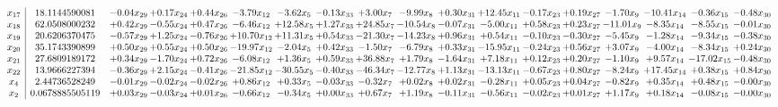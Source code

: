 \documentclass[9pt]{article}
\begin{document}
 \[\begin{array}{c| c c@{\hskip 2pt} c@{\hskip 2pt} c@{\hskip 2pt} c@{\hskip 2pt} c@{\hskip 2pt} c@{\hskip 2pt} c@{\hskip 2pt} c@{\hskip 2pt} c@{\hskip 2pt} c@{\hskip 2pt} c@{\hskip 2pt} c@{\hskip 2pt} c@{\hskip 2pt} c@{\hskip 2pt} c@{\hskip 2pt} c@{\hskip 2pt} }
 x_{17}   &  18.1144590081 & -0.04 x_{29} & +  0.17 x_{24} & +  0.44 x_{26} & -3.79 x_{12} & -3.62 x_{5} & -0.13 x_{33} & +  3.00 x_{7} & -9.99 x_{8} & +  0.30 x_{31} & + 12.45 x_{11} & -0.17 x_{23} & +  0.19 x_{27} & -1.70 x_{9} & -10.41 x_{14} & -0.36 x_{15} & -0.48 x_{30}\\
 x_{18}   &  62.0508000232 & +  0.42 x_{29} & -0.55 x_{24} & +  0.47 x_{26} & -6.46 x_{12} & + 12.58 x_{5} & +  1.27 x_{33} & + 24.85 x_{7} & -10.54 x_{8} & -0.07 x_{31} & -5.00 x_{11} & +  0.58 x_{23} & +  0.23 x_{27} & -11.01 x_{9} & -8.35 x_{14} & -8.55 x_{15} & -0.01 x_{30}\\
 x_{19}   &  20.6206370475 & -0.57 x_{29} & +  1.25 x_{24} & -0.76 x_{26} & + 10.70 x_{12} & + 11.31 x_{5} & +  0.54 x_{33} & -21.30 x_{7} & -14.23 x_{8} & +  0.96 x_{31} & +  0.54 x_{11} & -0.10 x_{23} & -0.30 x_{27} & -5.45 x_{9} & -1.28 x_{14} & -9.34 x_{15} & -0.38 x_{30}\\
 x_{20}   &  35.1743390899 & +  0.50 x_{29} & +  0.55 x_{24} & +  0.50 x_{26} & -19.97 x_{12} & -2.04 x_{5} & +  0.42 x_{33} & -1.50 x_{7} & -6.79 x_{8} & +  0.33 x_{31} & -15.95 x_{11} & -0.24 x_{23} & +  0.56 x_{27} & +  3.07 x_{9} & -4.00 x_{14} & -8.34 x_{15} & +  0.24 x_{30}\\
 x_{21}   &  27.6809189172 & +  0.34 x_{29} & -1.70 x_{24} & +  0.72 x_{26} & -6.08 x_{12} & +  1.36 x_{5} & +  0.59 x_{33} & + 36.88 x_{7} & +  1.79 x_{8} & -1.64 x_{31} & +  7.18 x_{11} & +  0.12 x_{23} & +  0.20 x_{27} & -1.10 x_{9} & +  9.57 x_{14} & -17.02 x_{15} & -0.48 x_{30}\\
 x_{22}   &  13.9666227394 & -0.36 x_{29} & +  2.15 x_{24} & -0.41 x_{26} & -21.85 x_{12} & -30.55 x_{5} & -0.40 x_{33} & -46.34 x_{7} & -12.77 x_{8} & +  1.13 x_{31} & -13.13 x_{11} & -0.67 x_{23} & +  0.80 x_{27} & -8.24 x_{9} & + 17.45 x_{14} & +  0.38 x_{15} & +  0.84 x_{30}\\
 x_{4}   &  2.44736528249 & -0.01 x_{29} & -0.02 x_{24} & -0.02 x_{26} & +  0.86 x_{12} & +  0.33 x_{5} & -0.03 x_{33} & -0.32 x_{7} & +  0.02 x_{8} & +  0.02 x_{31} & -0.28 x_{11} & +  0.05 x_{23} & +  0.04 x_{27} & -0.82 x_{9} & +  0.35 x_{14} & +  0.48 x_{15} & -0.00 x_{30}\\
 x_{2}   &  0.0678885505119 & +  0.03 x_{29} & -0.03 x_{24} & +  0.01 x_{26} & -0.66 x_{12} & -0.34 x_{5} & +  0.00 x_{33} & +  0.67 x_{7} & +  1.19 x_{8} & -0.11 x_{31} & -0.56 x_{11} & -0.02 x_{23} & +  0.01 x_{27} & +  1.17 x_{9} & +  0.18 x_{14} & -0.08 x_{15} & -0.00 x_{30}\\

\end{array}\]
\end{document}
